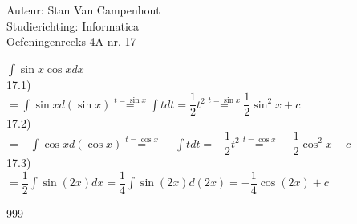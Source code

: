 \documentclass[a4paper]{article}
\begin{document}
  
\noindent \large Auteur: Stan Van Campenhout \\
\noindent \large Studierichting:  Informatica\\
\noindent \large Oefeningenreeks 4A nr. 17\\

\medskip

\normalsize

$ \displaystyle\int\sin x\cos x dx $\\

17.1) \\

$ = \displaystyle\int\sin xd\left(\sin x\right) \stackrel{t = \sin x}{=} \displaystyle\int tdt = \dfrac{1}{2}t^2 \stackrel {t = \sin x} = \dfrac{1}{2}\sin^2x + c $\\

17.2) \\

$ = -\displaystyle\int\cos xd\left(\cos x\right) \stackrel{t = \cos x}{=} -\displaystyle\int tdt = -\dfrac{1}{2}t^2 \stackrel{t = \cos x}{=} -\dfrac{1}{2}\cos^2x + c $\\

17.3) \\

$ = \dfrac{1}{2}\displaystyle\int\sin\left(2x\right)dx = \dfrac{1}{4}\displaystyle\int\sin\left(2x\right)d\left(2x\right) = -\dfrac{1}{4}\cos\left(2x\right) + c $\\

\begin{thebibliography}{999}
\end{thebibliography}
\end{document}
